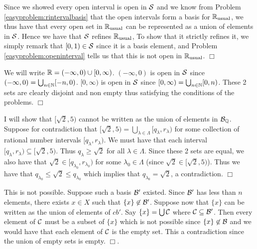 \documentclass{article}
\begin{document}
{\begin{spacedenumerate}
        \item Since we showed every open interval is open in $\mathcal{S}$ and we know from Problem \ref{easyproblem:rintervalbasis} that the open intervals form a basis for $\mathbb{R}_{\text{usual}}$, we thus have that every open set in $\mathbb{R}_{\text{usual}}$ can be represented as a union of elements in $\mathcal{S}$. Hence we have that $\mathcal{S}$ refines $\mathbb{R}_{\text{usual}}$, To show that it strictly refines it, we simply remark that $[0,1)\in \mathcal{S}$ since it is a basis element, and Problem \ref{easyproblem:openinterval} tells us that this is not open in $\mathbb{R}_{\text{usual}}$. $\Box$
        \item We will write $\mathbb{R} = (-\infty, 0) \cup [0, \infty)$. $(-\infty, 0)$ is open in $\mathcal{S}$ since $(-\infty, 0) = \bigcup_{n\in \mathbb{N}}[-n, 0)$. $[0, \infty)$ is open in $\mathcal{S}$ since $[0, \infty) = \bigcup_{n\in\mathbb{N}} [0,n)$. These 2 sets are clearly disjoint and non empty thus satisfying the conditions of the problems. $\Box$
        \item I will show that $[\sqrt{2}, 5)$ cannot be written as the union of elements in $\mathcal{B}_{\mathbb{Q}}$. Suppose for contradiction that $[\sqrt{2}, 5)  = \bigcup_{\lambda\in\Lambda}[q_{\lambda}, r_{\lambda})$ for some collection of rational number intervals $[q_{\lambda}, r_{\lambda})$. We must have that each interval $[q_{\lambda}, r_{\lambda}) \subseteq [\sqrt{2}, 5)$. Thus $q_{\lambda} \geq \sqrt{2}$ for all $\lambda\in \Lambda$. Since these 2 sets are equal, we also have that $\sqrt{2} \in [q_{\lambda_{0}}, r_{\lambda_{0}})$ for some $\lambda_{0}\in \Lambda$ (since $\sqrt{2}\in [\sqrt{2}, 5)$). Thus we have that $q_{\lambda_{0}}\leq \sqrt{2} \leq q_{\lambda_{0}}$ which implies that $q_{\lambda_{0}} = \sqrt{2}$, a contradiction. $\Box$ 
    \end{spacedenumerate}
}

 {
    This is not possible. Suppose such a basis $\mathcal{B}'$ existed. Since $\mathcal{B}'$ has less than $n$ elements, there exists $x\in X$ such that $\{x\}\not\in \mathcal{B}'$. Suppose now that $\{x\}$ can be written as the union of elements of $cb'$. Say $\{x\}  = \bigcup \mathcal{C}$ where $\mathcal{C}\subseteq \mathcal{B}'$. Then every element of $\mathcal{C}$ must be a subset of $\{x\}$ which is not possible since $\{x\}\not \in\mathcal{B}$ and we would have that each element of $\mathcal{C}$ is the empty set. This a contradiction since the union of empty sets is empty. $\Box$. 
}
\end{document}
